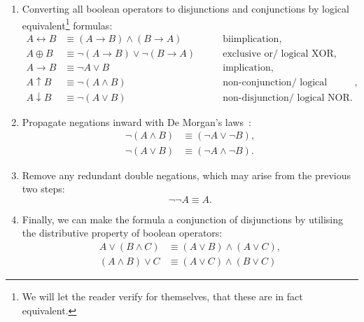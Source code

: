 \begin{enumerate}
    \item Converting all boolean operators to disjunctions and conjunctions by logical equivalent\footnote{We will let the reader verify for themselves, that these are in fact equivalent.} formulas:
    \begin{align*}
        A \leftrightarrow B &\equiv (A \rightarrow  B) \wedge (B \rightarrow A) \qquad &\text{biimplication},
        \\
        A \oplus B &\equiv \neg (A \rightarrow B) \vee \neg (B \rightarrow A) \qquad &\text{exclusive or/ logical XOR},
        \\
        A \rightarrow B &\equiv \neg A \vee B \qquad &\text{implication},
        \\
        A \uparrow B &\equiv \neg (A \wedge B) \qquad &\text{non-conjunction/ logical NAND},
        \\
        A \downarrow B &\equiv \neg (A \vee B) \qquad &\text{non-disjunction/ logical NOR}.
    \end{align*}
    \item Propagate negations inward with De Morgan's laws~\cite{A-Concise-Introduction-to-Logic,Introduction-to-logic,Math-Logic-for-CompSci}:
    \begin{align*}
        \neg (A \wedge B) &\equiv (\neg A \vee \neg B),
        \\
        \neg (A \vee B) &\equiv (\neg A \wedge \neg B).
    \end{align*}
    \item Remove any redundant double negations, which may arise from the previous two steps:
    \begin{equation*}
        \neg \neg A \equiv A.
    \end{equation*}
    \item Finally, we can make the formula a conjunction of disjunctions by utilising the distributive property of boolean operators:
    \begin{align*}
        A \vee (B \wedge C) &\equiv (A \vee B) \wedge (A \vee C),
        \\
        (A \wedge B) \vee C &\equiv (A \vee C) \wedge (B \vee C) \tag*{\(\blacksquare\).}
    \end{align*}
\end{enumerate}

